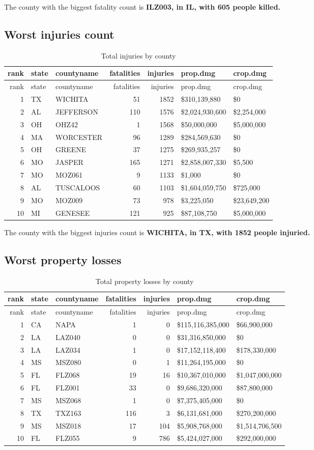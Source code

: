 The county with the biggest fatality count is \textbf{ILZ003, in IL,
with 605 people killed.}

\subsection{Worst injuries count}\label{worst-injuries-count}

\begin{longtable}[]{@{}rllrrll@{}}
\caption{Total injuries by county}\tabularnewline
\toprule
rank & state & countyname & fatalities & injuries & prop.dmg &
crop.dmg\tabularnewline
\midrule
\endfirsthead
\toprule
rank & state & countyname & fatalities & injuries & prop.dmg &
crop.dmg\tabularnewline
\midrule
\endhead
1 & TX & WICHITA & 51 & 1852 & \$310,139,880 & \$0\tabularnewline
2 & AL & JEFFERSON & 110 & 1576 & \$2,024,930,600 &
\$2,254,000\tabularnewline
3 & OH & OHZ42 & 1 & 1568 & \$50,000,000 & \$5,000,000\tabularnewline
4 & MA & WORCESTER & 96 & 1289 & \$284,569,630 & \$0\tabularnewline
5 & OH & GREENE & 37 & 1275 & \$269,935,257 & \$0\tabularnewline
6 & MO & JASPER & 165 & 1271 & \$2,858,007,330 & \$5,500\tabularnewline
7 & MO & MOZ061 & 9 & 1133 & \$1,000 & \$0\tabularnewline
8 & AL & TUSCALOOS & 60 & 1103 & \$1,604,059,750 &
\$725,000\tabularnewline
9 & MO & MOZ009 & 73 & 978 & \$3,225,050 & \$23,649,200\tabularnewline
10 & MI & GENESEE & 121 & 925 & \$87,108,750 &
\$5,000,000\tabularnewline
\bottomrule
\end{longtable}

The county with the biggest injuries count is \textbf{WICHITA, in TX,
with 1852 people injuried.}

\subsection{Worst property losses}\label{worst-property-losses}

\begin{longtable}[]{@{}rllrrll@{}}
\caption{Total property losses by county}\tabularnewline
\toprule
rank & state & countyname & fatalities & injuries & prop.dmg &
crop.dmg\tabularnewline
\midrule
\endfirsthead
\toprule
rank & state & countyname & fatalities & injuries & prop.dmg &
crop.dmg\tabularnewline
\midrule
\endhead
1 & CA & NAPA & 1 & 0 & \$115,116,385,000 & \$66,900,000\tabularnewline
2 & LA & LAZ040 & 0 & 0 & \$31,316,850,000 & \$0\tabularnewline
3 & LA & LAZ034 & 1 & 0 & \$17,152,118,400 &
\$178,330,000\tabularnewline
4 & MS & MSZ080 & 0 & 1 & \$11,264,195,000 & \$0\tabularnewline
5 & FL & FLZ068 & 19 & 16 & \$10,367,010,000 &
\$1,047,000,000\tabularnewline
6 & FL & FLZ001 & 33 & 0 & \$9,686,320,000 & \$87,800,000\tabularnewline
7 & MS & MSZ068 & 1 & 0 & \$7,375,405,000 & \$0\tabularnewline
8 & TX & TXZ163 & 116 & 3 & \$6,131,681,000 &
\$270,200,000\tabularnewline
9 & MS & MSZ018 & 17 & 104 & \$5,908,768,000 &
\$1,514,706,500\tabularnewline
10 & FL & FLZ055 & 9 & 786 & \$5,424,027,000 &
\$292,000,000\tabularnewline
\bottomrule
\end{longtable}

